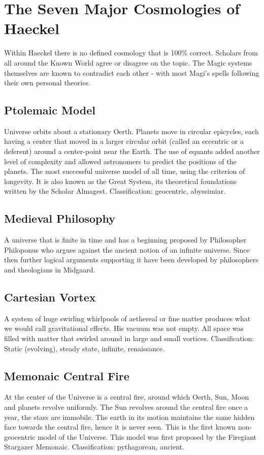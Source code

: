 \section{The Seven Major Cosmologies of Haeckel}
\begin{multicols}{2}

Within Haeckel there is no defined cosmology that is 100\% correct. Scholars from all around the Known World agree or disagree on the topic. The Magic systems themselves are known to contradict each other - with most Magi's spells following their own personal theories. 

\subsection{Ptolemaic Model} Universe orbits about a stationary Oerth. Planets move in circular epicycles, each having a center that moved in a larger circular orbit (called an eccentric or a deferent) around a center-point near the Earth. The use of equants added another level of complexity and allowed astronomers to predict the positions of the planets. The most successful universe model of all time, using the criterion of longevity. It is also known as the Great System, its theoretical foundations written by the Scholar Almagest. Classification: geocentric, abyssimiar. 
\subsection{Medieval Philosophy} A universe that is finite in time and has a beginning proposed by Philosopher Philoponus who argues against the ancient notion of an infinite universe. Since then further logical arguments supporting it have been developed by philosophers and theologians in Midgaard.

\subsection{Cartesian Vortex} A system of huge swirling whirlpools of aethereal or fine matter produces what we would call gravitational effects. His vacuum was not empty. All space was filled with matter that swirled around in large and small vortices. Classification: Static (evolving), steady state, infinite, renaissance.
\subsection{Memonaic Central Fire} At the center of the Universe is a central fire, around which Oerth, Sun, Moon and planets revolve uniformly. The Sun revolves around the central fire once a year, the stars are immobile. The earth in its motion maintains the same hidden face towards the central fire, hence it is never seen. This is the first known non-geocentric model of the Universe. This model was first proposed by the Firegiant Stargazer Memonaic. Classification: pythagorean, ancient.

\end{multicols}
